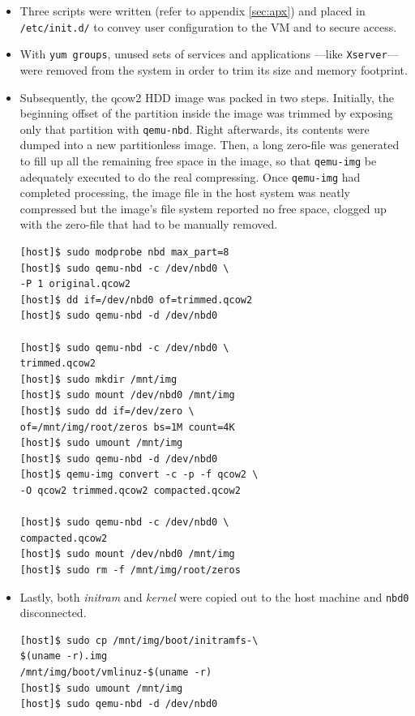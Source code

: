 \documentclass{sig-alternate}
\begin{document}
\begin{itemize}
 \item Three scripts were written (refer to appendix \ref{sec:apx}) and placed in \texttt{/etc/init.d/} to convey user configuration to the VM and to secure access.
 
 \item With \texttt{yum groups}, unused sets of services and applications ---like \texttt{Xserver}--- were removed from the system in order to trim its size and memory footprint.
 
 \item Subsequently, the qcow2 HDD image was packed in two steps. Initially, the beginning offset of the partition inside the image was trimmed by exposing only that partition with \texttt{qemu-nbd}. Right afterwards, its contents were dumped into a new partitionless image. Then, a long zero-file was generated to fill up all the remaining free space in the image, so that \texttt{qemu-img} be adequately executed to do the real compressing. Once \texttt{qemu-img} had completed processing, the image file in the host system was neatly compressed but the image's file system reported no free space, clogged up with the zero-file that had to be manually removed.
 
   \begin{verbatim}
[host]$ sudo modprobe nbd max_part=8
[host]$ sudo qemu-nbd -c /dev/nbd0 \
-P 1 original.qcow2
[host]$ dd if=/dev/nbd0 of=trimmed.qcow2
[host]$ sudo qemu-nbd -d /dev/nbd0

[host]$ sudo qemu-nbd -c /dev/nbd0 \
trimmed.qcow2
[host]$ sudo mkdir /mnt/img
[host]$ sudo mount /dev/nbd0 /mnt/img
[host]$ sudo dd if=/dev/zero \
of=/mnt/img/root/zeros bs=1M count=4K
[host]$ sudo umount /mnt/img
[host]$ sudo qemu-nbd -d /dev/nbd0
[host]$ qemu-img convert -c -p -f qcow2 \
-O qcow2 trimmed.qcow2 compacted.qcow2

[host]$ sudo qemu-nbd -c /dev/nbd0 \
compacted.qcow2
[host]$ sudo mount /dev/nbd0 /mnt/img
[host]$ sudo rm -f /mnt/img/root/zeros
   \end{verbatim}
   
 \item Lastly, both \emph{initram} and \emph{kernel} were copied out to the host machine and \texttt{nbd0} disconnected.
 
 \begin{verbatim}
[host]$ sudo cp /mnt/img/boot/initramfs-\
$(uname -r).img
/mnt/img/boot/vmlinuz-$(uname -r)
[host]$ sudo umount /mnt/img
[host]$ sudo qemu-nbd -d /dev/nbd0
 \end{verbatim}

\end{itemize}
\end{document}

